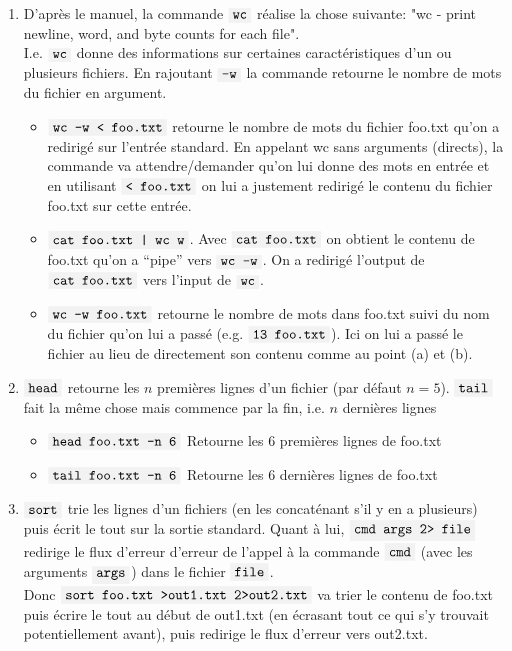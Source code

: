 \documentclass[french]{article}
\newcommand{\code}[1]{$\mbox{\colorbox{light-gray}{\texttt{#1}}}$}
\newcommand{\quo}[1]{``{#1}''}
\begin{document}
\begin{enumerate}[label=(\alph*)]
\item  D'après le manuel, la commande \code{wc} réalise la chose suivante: "wc - print newline, word, and byte counts for each file". \\
I.e. \code{wc} donne des informations sur certaines caractéristiques d'un ou plusieurs fichiers. En rajoutant \code{-w} la commande retourne le nombre de mots du fichier en argument.

\begin{itemize}
    \item \code{wc -w < foo.txt} retourne le nombre de mots du fichier foo.txt qu'on a redirigé sur l'entrée standard.
    En appelant wc sans arguments (directs), la commande va attendre/demander qu'on lui donne des mots en entrée et en utilisant \code{< foo.txt} on lui a justement redirigé le contenu du fichier foo.txt sur cette entrée.\\
    
    \item \code{cat foo.txt | wc w}. Avec \code{cat foo.txt} on obtient le contenu de foo.txt qu'on a \quo{pipe} vers \code{wc -w}. On a redirigé l'output de \code{cat foo.txt} vers l'input de \code{wc}. \\
    
    \item \code{wc -w foo.txt} retourne le nombre de mots dans foo.txt suivi du nom du fichier qu'on lui a passé (e.g. \code{13 foo.txt}). Ici on lui a passé le fichier au lieu de directement son contenu comme au point (a) et (b).\\
\end{itemize}
    
\item \code{head} retourne les $n$ premières lignes d'un fichier (par défaut $n=5$). \code{tail} fait la même chose mais commence par la fin, i.e. $n$ dernières lignes

\begin{itemize}
    \item \code{head foo.txt -n 6} Retourne les 6 premières lignes de foo.txt
    \item \code{tail foo.txt -n 6} Retourne les 6 dernières lignes de foo.txt\\
\end{itemize}

\item \code{sort} trie les lignes d'un fichiers (en les concaténant s'il y en a plusieurs) puis écrit le tout sur la sortie standard.
Quant à lui, \code{cmd args 2> file} redirige le flux d'erreur d'erreur de l'appel à la commande \code{cmd} (avec les arguments \code{args}) dans le fichier \code{file}.\\ Donc \code{sort foo.txt >out1.txt 2>out2.txt} va trier le contenu de foo.txt puis écrire le tout au début de out1.txt (en écrasant tout ce qui s'y trouvait potentiellement avant), puis redirige le flux d'erreur vers out2.txt.\\
\newpage


\end{enumerate}
\end{document}

